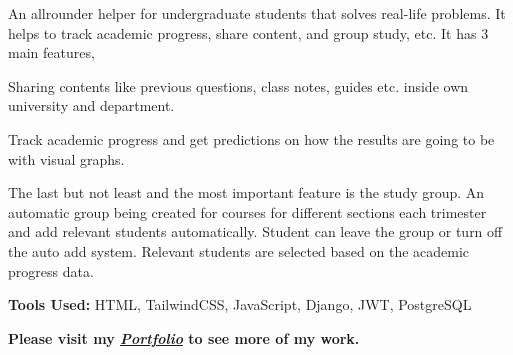     \begin{onecolentry}
        \begin{highlights}
            \item An allrounder helper for undergraduate students that solves real-life problems. It helps to track academic progress, share content, and group study, etc. It has 3 main features, \begin{highlights}
                \item Sharing contents like previous questions, class notes, guides etc. inside own university and department.
                \item Track academic progress and get predictions on how the results are going to be with visual graphs.
                \item The last but not least and the most important feature is the study group. An automatic group being created for courses for different sections each trimester and add relevant students automatically. Student can leave the group or turn off the auto add system. Relevant students are selected based on the academic progress data.
            \end{highlights}
            \item \textbf{Tools Used:} HTML, TailwindCSS, JavaScript, Django, JWT, PostgreSQL
        \end{highlights}
    \end{onecolentry}

    \vspace{0.3 cm}
    \textbf{Please visit my \textit{\href{https://ehsankhan.me}{Portfolio}} to see more of my work.}